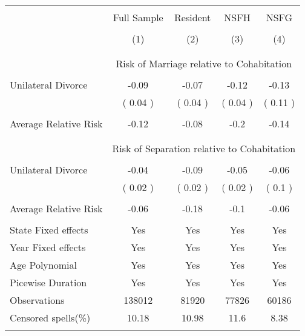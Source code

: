 \footnotesize 
\begin{tabular}{@{\extracolsep{5pt}}lcccc} 
\\[-1.8ex]\hline 
\hline 
\\[-1.8ex] & \multicolumn{1}{c}{Full Sample} & \multicolumn{1}{c}{Resident}& \multicolumn{1}{c}{NSFH}& \multicolumn{1}{c}{NSFG} \\ 
\\[-1.8ex] & \multicolumn{1}{c}{(1)} & \multicolumn{1}{c}{(2)} & \multicolumn{1}{c}{(3)} & \multicolumn{1}{c}{(4)}\\ 
\hline \\[-1.8ex] 
\\[-2.2ex] & \multicolumn{4}{c}{Risk of Marriage relative to Cohabitation} \\  
 \hline \\[-1.8ex]
 Unilateral Divorce &  -0.09  &  -0.07  &  -0.12  &  -0.13  \\ 
  & ( 0.04 ) & ( 0.04 ) & ( 0.04 ) & ( 0.11 ) \\  
 \hline \\[-1.8ex]
 Average Relative Risk &  -0.12  &  -0.08  &  -0.2  &  -0.14  \\ 
 \hline \\[-1.8ex]
 \\[-2.2ex] & \multicolumn{4}{c}{Risk of Separation relative to Cohabitation} \\  
 \hline \\[-1.8ex]
 Unilateral Divorce &  -0.04  &  -0.09  &  -0.05  &  -0.06  \\ 
  & ( 0.02 ) & ( 0.02 ) & ( 0.02 ) & ( 0.1 ) \\  
 \hline \\[-1.8ex]
 Average Relative Risk &  -0.06  &  -0.18  &  -0.1  &  -0.06  \\ 
 \hline \\[-1.8ex]
State Fixed effects & Yes & Yes & Yes & Yes \\ 
Year Fixed effects & Yes & Yes & Yes & Yes \\ 
Age Polynomial & Yes & Yes & Yes & Yes \\
Picewise Duration & Yes & Yes & Yes & Yes \\ 
\hline
Observations & \multicolumn{1}{c}{ 138012 } & \multicolumn{1}{c}{ 81920 } & \multicolumn{1}{c}{ 77826 } & \multicolumn{1}{c}{ 60186 } \\ 
\hline
Censored spells(\%) & \multicolumn{1}{c}{ 10.18 } & \multicolumn{1}{c}{ 10.98 } & \multicolumn{1}{c}{ 11.6 } & \multicolumn{1}{c}{ 8.38 } \\ 
\hline 
\hline \\[-1.8ex] 
\end{tabular}
